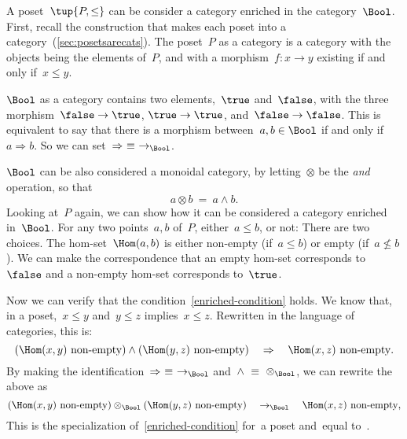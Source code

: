 \begin{example}
    A poset~$\tup{P, \leq}$ can be consider a category enriched in the
    category~$\Bool$. First, recall the construction that makes each poset into a
    category~(\cref{sec:posetsarecats}). The poset~$P$ as a category is a category with the objects being the
    elements of~$P$, and with a morphism~$f\colon x \to y$ existing if and only if~$x\leq y$.

    $\Bool$ as a category contains two elements,~$\true$ and~$\false$, with
    the three morphism~$\false \to \true$, $\true \to \true$, and~$\false \to \false$. This is equivalent to say that there is a morphism between~$a, b \in \Bool$ if and only if~$a \Rightarrow b$. So we can set~$\Rightarrow\ \equiv\ \to_{\Bool}$.

    $\Bool$ can be also considered a monoidal category, by letting~$\otimes$ be
    the \emph{and} operation, so that
    \begin{equation}
        a \otimes b\ =\ a \wedge b.
    \end{equation}
    Looking at~$P$ again, we can show how it can be considered a category enriched in~$\Bool$. For any two points~$a, b$ of~$P$, either~$a \leq b$, or not: There are two choices. The hom-set~$\Hom(a, b)$ is either non-empty
    (if~$a \leq b$) or empty (if~$a \not\leq b$). We can make the correspondence that an empty hom-set corresponds to~$\false$ and a non-empty hom-set corresponds to~$\true$.

    Now we can verify that the condition~\eqref{enriched-condition} holds. We
    know that, in a poset,~$x \leq y$ and~$y \leq z$ implies~$x \leq z$.
%
    Rewritten in the language of categories, this is:
    \begin{equation}
        (\Hom(x,y)\ \text{non-empty})
        \wedge
        (\Hom(y, z)\ \text{non-empty})
        \quad
        \Rightarrow
        \quad
        \Hom(x, z)\ \text{non-empty}.
    \end{equation}
    By making the identification~$\Rightarrow\ \equiv\ \to_{\Bool}$ and~$\wedge\ \equiv\ \otimes_{\Bool}$, we can rewrite the above as
    \begin{equation}
        (\Hom(x,y)\ \text{non-empty})
        \otimes_{\Bool}
        (\Hom(y, z)\ \text{non-empty})
        \quad
        \to_{\Bool}
        \quad
        \Hom(x, z)\ \text{non-empty},
    \end{equation}
    This is the specialization of~\eqref{enriched-condition}
    for~\CatC a poset and~\CatD equal to~\Bool.
\end{example}

